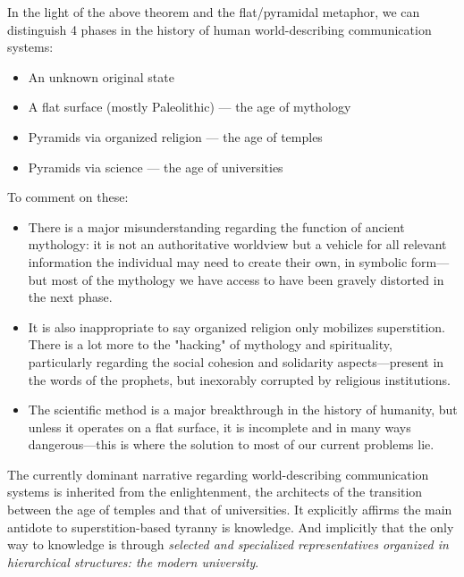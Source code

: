 \documentclass[11pt]{article}
\begin{document}
In the light of the above theorem and the flat/pyramidal metaphor, we can distinguish 4
phases in the history of human world-describing communication systems:

\begin{itemize}

\item An unknown original state

\item A flat surface (mostly Paleolithic) --- the age of mythology

\item Pyramids via organized religion --- the age of temples

\item Pyramids via science --- the age of universities

\end{itemize}

To comment on these:

\begin{itemize}

\item There is a major misunderstanding regarding the function of ancient mythology: it is not
an authoritative worldview but a vehicle for all relevant information the individual may
need to create their own, in symbolic form---but most of the mythology we have access to
have been gravely distorted in the next phase.

\item It is also inappropriate to say organized religion only mobilizes superstition. There is
a lot more to the "hacking" of mythology and spirituality, particularly regarding the
social cohesion and solidarity aspects---present in the words of the prophets, but
inexorably corrupted by religious institutions.

\item The scientific method is a major breakthrough in the history of humanity, but unless it
operates on a flat surface, it is incomplete and in many ways dangerous---this is where
the solution to most of our current problems lie.

\end{itemize}

The currently dominant narrative regarding world-describing communication systems is
inherited from the enlightenment, the architects of the transition between the age of
temples and that of universities. It explicitly affirms the main antidote to
superstition-based tyranny is knowledge. And implicitly that the only way to knowledge
is through \emph{selected and specialized representatives organized in hierarchical
structures: the modern university}.
\end{document}

